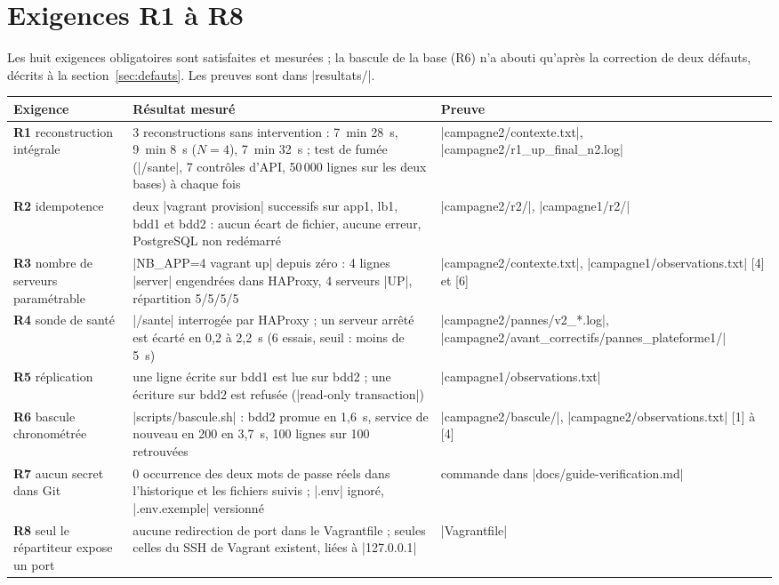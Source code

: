 \documentclass[a4paper,11pt]{article}
\begin{document}
\section{Exigences R1 à R8}

Les huit exigences obligatoires sont satisfaites et mesurées ; la bascule de la base (R6) n'a abouti qu'après la correction de deux défauts, décrits à la section~\ref{sec:defauts}. Les preuves sont dans |resultats/|.

{\small
\begin{longtable}{@{}L{2.8cm}L{7.9cm}L{4.5cm}@{}}
\toprule
\textbf{Exigence} & \textbf{Résultat mesuré} & \textbf{Preuve}\\
\midrule\endhead
\textbf{R1} reconstruction intégrale & 3 reconstructions sans intervention : 7~min 28~s, 9~min 8~s ($N=4$), 7~min 32~s ; test de fumée (|/sante|, 7 contrôles d'API, 50\,000 lignes sur les deux bases) à chaque fois & |campagne2/contexte.txt|, |campagne2/r1_up_final_n2.log|\\
\textbf{R2} idempotence & deux |vagrant provision| successifs sur app1, lb1, bdd1 et bdd2 : aucun écart de fichier, aucune erreur, PostgreSQL non redémarré & |campagne2/r2/|, |campagne1/r2/|\\
\textbf{R3} nombre de serveurs paramétrable & |NB_APP=4 vagrant up| depuis zéro : 4 lignes |server| engendrées dans HAProxy, 4 serveurs |UP|, répartition 5/5/5/5 & |campagne2/contexte.txt|, |campagne1/observations.txt| [4] et [6]\\
\textbf{R4} sonde de santé & |/sante| interrogée par HAProxy ; un serveur arrêté est écarté en 0,2 à 2,2~s (6 essais, seuil : moins de 5~s) & |campagne2/pannes/v2_*.log|, |campagne2/avant_correctifs/pannes_plateforme1/|\\
\textbf{R5} réplication & une ligne écrite sur bdd1 est lue sur bdd2 ; une écriture sur bdd2 est refusée (|read-only transaction|) & |campagne1/observations.txt|\\
\textbf{R6} bascule chronométrée & |scripts/bascule.sh| : bdd2 promue en 1,6~s, service de nouveau en 200 en 3,7~s, 100 lignes sur 100 retrouvées & |campagne2/bascule/|, |campagne2/observations.txt| [1] à [4]\\
\textbf{R7} aucun secret dans Git & 0 occurrence des deux mots de passe réels dans l'historique et les fichiers suivis ; |.env| ignoré, |.env.exemple| versionné & commande dans |docs/guide-verification.md|\\
\textbf{R8} seul le répartiteur expose un port & aucune redirection de port dans le Vagrantfile ; seules celles du SSH de Vagrant existent, liées à |127.0.0.1| & |Vagrantfile|\\
\bottomrule
\end{longtable}}
\end{document}
